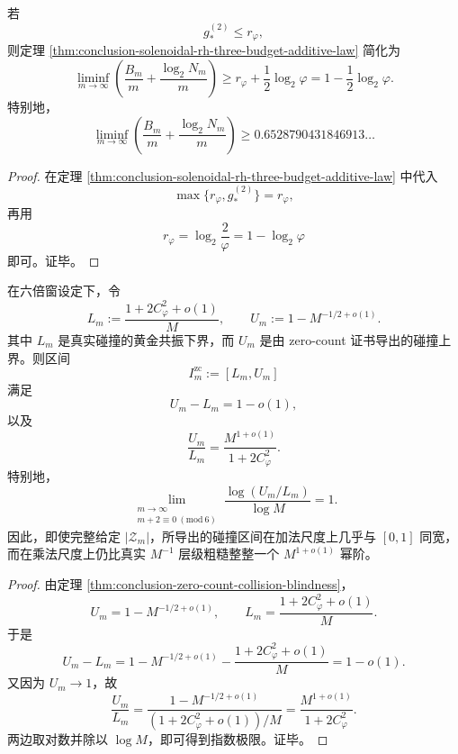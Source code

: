 \begin{corollary}[冻结瓶颈不超过折叠瓶颈时的黄金常数塌缩]\label{cor:conclusion-solenoidal-rh-golden-total-burden-collapse}
若
\[
g_*^{(2)}\le r_\varphi,
\]
则定理 \ref{thm:conclusion-solenoidal-rh-three-budget-additive-law} 简化为
\[
\liminf_{m\to\infty}
\left(
\frac{B_m}{m}
+
\frac{\log_2 N_m}{m}
\right)
\ge
r_\varphi+\frac12\log_2\varphi
=
1-\frac12\log_2\varphi.
\]
特别地，
\[
\liminf_{m\to\infty}
\left(
\frac{B_m}{m}
+
\frac{\log_2 N_m}{m}
\right)
\ge
0.6528790431846913\ldots
\]
\end{corollary}

\begin{proof}
在定理 \ref{thm:conclusion-solenoidal-rh-three-budget-additive-law} 中代入
\[
\max\!\bigl\{r_\varphi,g_*^{(2)}\bigr\}=r_\varphi,
\]
再用
\[
r_\varphi=\log_2\frac{2}{\varphi}=1-\log_2\varphi
\]
即可。证毕。
\end{proof}

\begin{theorem}\label{thm:conclusion-zero-count-certificate-unit-additive-width}
在六倍窗设定下，令
\[
L_m:=\frac{1+2C_\varphi^2+o(1)}{M},
\qquad
U_m:=1-M^{-1/2+o(1)}.
\]
其中 \(L_m\) 是真实碰撞的黄金共振下界，而 \(U_m\) 是由 zero-count 证书导出的碰撞上界。则区间
\[
I_m^{\mathrm{zc}}:=[L_m,U_m]
\]
满足
\[
U_m-L_m=1-o(1),
\]
以及
\[
\frac{U_m}{L_m}
=
\frac{M^{1+o(1)}}{1+2C_\varphi^2}.
\]
特别地，
\[
\lim_{\substack{m\to\infty\\ m+2\equiv0\ (\mathrm{mod}\ 6)}}
\frac{\log(U_m/L_m)}{\log M}=1.
\]
因此，即使完整给定 \(|\mathcal Z_m|\)，所导出的碰撞区间在加法尺度上几乎与 \([0,1]\) 同宽，而在乘法尺度上仍比真实 \(M^{-1}\) 层级粗糙整整一个 \(M^{1+o(1)}\) 幂阶。
\end{theorem}

\begin{proof}
由定理 \ref{thm:conclusion-zero-count-collision-blindness}，
\[
U_m=1-M^{-1/2+o(1)},
\qquad
L_m=\frac{1+2C_\varphi^2+o(1)}{M}.
\]
于是
\[
U_m-L_m
=
1-M^{-1/2+o(1)}-\frac{1+2C_\varphi^2+o(1)}{M}
=
1-o(1).
\]
又因为 \(U_m\to 1\)，故
\[
\frac{U_m}{L_m}
=
\frac{1-M^{-1/2+o(1)}}{(1+2C_\varphi^2+o(1))/M}
=
\frac{M^{1+o(1)}}{1+2C_\varphi^2}.
\]
两边取对数并除以 \(\log M\)，即可得到指数极限。证毕。
\end{proof}

